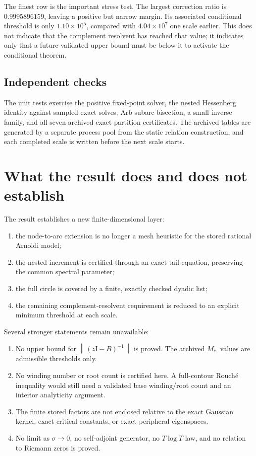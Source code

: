 \documentclass[11pt]{article}
\theoremstyle{definition}
\theoremstyle{remark}
\newcommand{\Id}{\mathrm I}
\newcommand{\norm}[1]{\left\lVert#1\right\rVert}
\begin{document}
The finest row is the important stress test.  The largest correction ratio
is $0.9995896159$, leaving a positive but narrow margin.  Its associated
conditional threshold is only $1.10\times10^5$, compared with
$4.04\times10^7$ one scale earlier.  This does not indicate that the
complement resolvent has reached that value; it indicates only that a future
validated upper bound must be below it to activate the conditional theorem.

\subsection{Independent checks}

The unit tests exercise the positive fixed-point solver, the nested
Hessenberg identity against sampled exact solves, Arb subarc bisection, a
small inverse family, and all seven archived exact partition certificates.
The archived tables are generated by a separate process pool from the static
relation construction, and each completed scale is written before the next
scale starts.


\section{What the result does and does not establish}
\label{sec:limits}

The result establishes a new finite-dimensional layer:
\begin{enumerate}
 \item the node-to-arc extension is no longer a mesh heuristic for the
       stored rational Arnoldi model;
 \item the nested increment is certified through an exact tail equation,
       preserving the common spectral parameter;
 \item the full circle is covered by a finite, exactly checked dyadic list;
 \item the remaining complement-resolvent requirement is reduced to an
       explicit minimum threshold at each scale.
\end{enumerate}

Several stronger statements remain unavailable:
\begin{enumerate}
 \item No upper bound for $\norm{(z\Id-B)^{-1}}$ is proved.  The archived
       $M_*^-$ values are admissible thresholds only.
 \item No winding number or root count is certified here.  A full-contour
       Rouché inequality would still need a validated base winding/root
       count and an interior analyticity argument.
 \item The finite stored factors are not enclosed relative to the exact
       Gaussian kernel, exact critical constants, or exact peripheral
       eigenspaces.
 \item No limit as $\sigma\to0$, no self-adjoint generator, no
       $T\log T$ law, and no relation to Riemann zeros is proved.
\end{enumerate}
\end{document}
